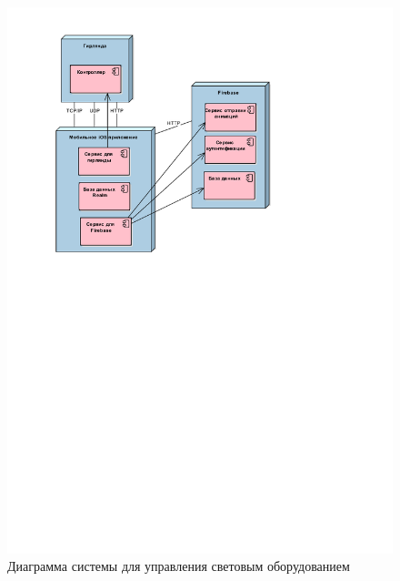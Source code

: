 ~
\begin{figure}[H]
\centering
	\includegraphics[scale=0.8]{figures/uml_deployment.pdf}
	\caption{Диаграмма системы для управления световым оборудованием}
	\label{fig:develop:umlDiagrams:deployment}
\end{figure}
